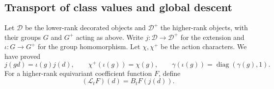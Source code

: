 \subsection{Transport of class values and global descent}

Let $\mathcal D$ be the lower-rank decorated objects and
$\mathcal D^+$ the higher-rank objects, with their groups
$G$ and $G^+$ acting as above.  Write
$j:\mathcal D\to\mathcal D^+$ for the extension and
$\iota:G\to G^+$ for the group homomorphism.  Let
$\chi,\chi^+$ be the action characters.  We have proved
\begin{equation}\label{atl-action-compatibility}
 j(gd)=\iota(g)j(d),\qquad
 \chi^+(\iota(g))=\chi(g),\qquad
 \gamma(\iota(g))=\operatorname{diag}(\gamma(g),1).
\end{equation}
For a higher-rank equivariant coefficient function $F$,
define
\begin{equation}\label{atl-lowering}
                         (\mathcal L_tF)(d)=B_tF(j(d)).
\end{equation}


